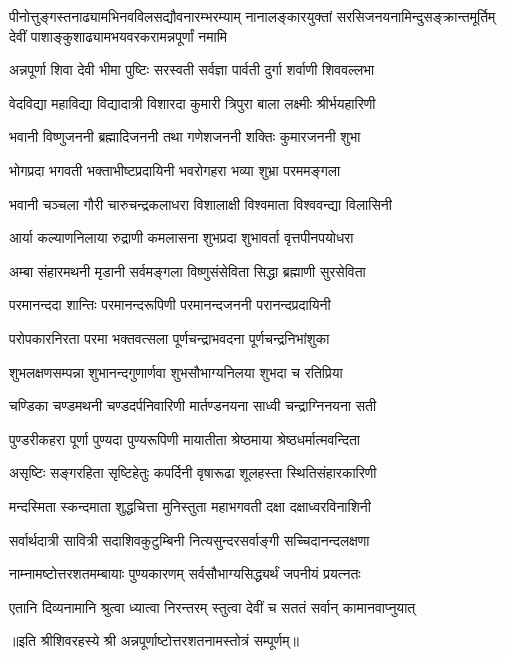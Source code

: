 
{पीनोत्तुङ्गस्तनाढ्यामभिनवविलसद्यौवनारम्भरम्याम्}
{नानालङ्कारयुक्तां सरसिजनयनामिन्दुसङ्क्रान्तमूर्तिम्}
{देवीं पाशाङ्कुशाढ्यामभयवरकरामन्नपूर्णां नमामि}


\twolineshloka
{अन्नपूर्णा शिवा देवी भीमा पुष्टिः सरस्वती}
{सर्वज्ञा पार्वती दुर्गा शर्वाणी शिववल्लभा}

\twolineshloka
{वेदविद्या महाविद्या विद्यादात्री विशारदा}
{कुमारी त्रिपुरा बाला लक्ष्मीः श्रीर्भयहारिणी}

\twolineshloka
{भवानी विष्णुजननी ब्रह्मादिजननी तथा}
{गणेशजननी शक्तिः कुमारजननी शुभा}

\twolineshloka
{भोगप्रदा भगवती भक्ताभीष्टप्रदायिनी}
{भवरोगहरा भव्या शुभ्रा परममङ्गला}

\twolineshloka
{भवानी चञ्चला गौरी चारुचन्द्रकलाधरा}
{विशालाक्षी विश्वमाता विश्ववन्द्या विलासिनी}

\twolineshloka
{आर्या कल्याणनिलाया रुद्राणी कमलासना}
{शुभप्रदा शुभावर्ता वृत्तपीनपयोधरा}

\twolineshloka
{अम्बा संहारमथनी मृडानी सर्वमङ्गला}
{विष्णुसंसेविता सिद्धा ब्रह्माणी सुरसेविता}

\twolineshloka
{परमानन्ददा शान्तिः परमानन्दरूपिणी}
{परमानन्दजननी परानन्दप्रदायिनी}

\twolineshloka
{परोपकारनिरता परमा भक्तवत्सला}
{पूर्णचन्द्राभवदना पूर्णचन्द्रनिभांशुका}

\twolineshloka
{शुभलक्षणसम्पन्ना शुभानन्दगुणार्णवा}
{शुभसौभाग्यनिलया शुभदा च रतिप्रिया}

\twolineshloka
{चण्डिका चण्डमथनी चण्डदर्पनिवारिणी}
{मार्तण्डनयना साध्वी चन्द्राग्निनयना सती}

\twolineshloka
{पुण्डरीकहरा पूर्णा पुण्यदा पुण्यरूपिणी}
{मायातीता श्रेष्ठमाया श्रेष्ठधर्मात्मवन्दिता}

\twolineshloka
{असृष्टिः सङ्गरहिता सृष्टिहेतुः कपर्दिनी}
{वृषारूढा शूलहस्ता स्थितिसंहारकारिणी}

\twolineshloka
{मन्दस्मिता स्कन्दमाता शुद्धचित्ता मुनिस्तुता}
{महाभगवती दक्षा दक्षाध्वरविनाशिनी}

\twolineshloka
{सर्वार्थदात्री सावित्री सदाशिवकुटुम्बिनी}
{नित्यसुन्दरसर्वाङ्गी सच्चिदानन्दलक्षणा}

\twolineshloka
{नाम्नामष्टोत्तरशतमम्बायाः पुण्यकारणम्}
{सर्वसौभाग्यसिद्ध्यर्थं जपनीयं प्रयत्नतः}

\twolineshloka
{एतानि दिव्यनामानि श्रुत्वा ध्यात्वा निरन्तरम्}
{स्तुत्वा देवीं च सततं सर्वान् कामानवाप्नुयात्}

{॥इति श्रीशिवरहस्ये श्री अन्नपूर्णाष्टोत्तरशतनामस्तोत्रं सम्पूर्णम्॥}
